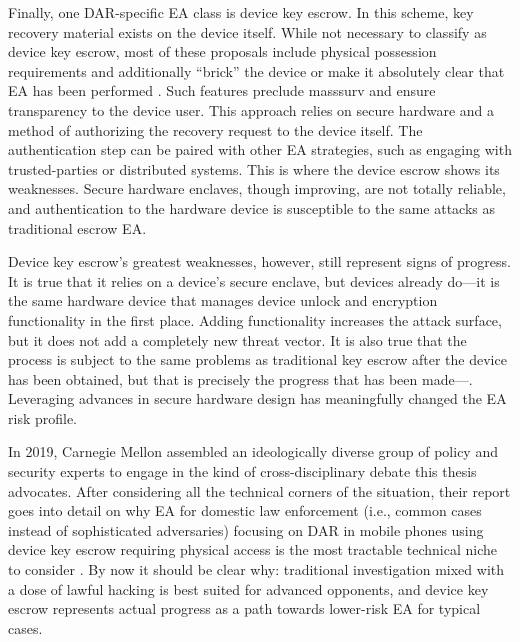 Finally, one \ac{DAR}-specific \ac{EA} class is device key escrow. In this scheme, key recovery material exists on the
device itself. While not necessary to classify as device key escrow, most of these proposals include physical possession
requirements and additionally ``brick'' the device or make it absolutely clear that \ac{EA} has been performed
\cite{savage_lawful_2018} \cite{ozzie_2018}. Such features preclude \ac{masssurv} and ensure transparency to the device
user. This approach relies on secure hardware and a method of authorizing the recovery request to the device itself. The
authentication step can be paired with other \ac{EA} strategies, such as engaging with trusted-parties or distributed
systems. This is where the device escrow shows its weaknesses. Secure hardware enclaves, though improving, are not
totally reliable, and authentication to the hardware device is susceptible to the same attacks as traditional escrow
\ac{EA}.

Device key escrow's greatest weaknesses, however, still represent signs of progress. It is true that it relies on a
device's secure enclave, but devices already do---it is the same hardware device that manages device unlock and
encryption functionality in the first place. Adding functionality increases the attack surface, but it does not add a
completely new threat vector. It is also true that the process is subject to the same problems as traditional key escrow
after the device has been obtained, but that is precisely the progress that has been made---. Leveraging advances in secure hardware design has meaningfully changed the \ac{EA} risk profile.

In 2019, Carnegie Mellon assembled an ideologically diverse group of policy and security experts to engage in the kind
of cross-disciplinary debate this thesis advocates. After considering all the technical corners of the situation, their
report goes into detail on why \ac{EA} for domestic law enforcement (i.e., common cases instead of sophisticated
adversaries) focusing on \ac{DAR} in mobile phones using device key escrow requiring physical access is the most
tractable technical niche to consider \cite{group_2019}. By now it should be clear why: traditional investigation mixed
with a dose of lawful hacking is best suited for advanced opponents, and device key escrow represents actual progress as
a path towards lower-risk \ac{EA} for typical cases.

